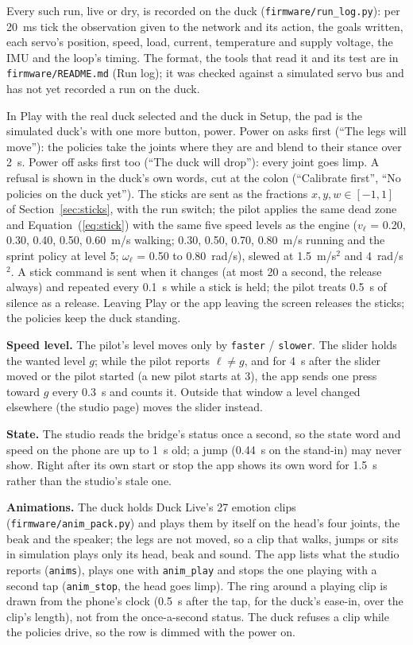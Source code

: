 \documentclass[11pt]{article}
\begin{document}
Every such run, live or dry, is recorded on the duck (\texttt{firmware/run\_log.py}): per 20~ms tick the
observation given to the network and its action, the goals written, each servo's position, speed, load, current,
temperature and supply voltage, the IMU and the loop's timing. The format, the tools that read it and its test are
in \texttt{firmware/README.md} (Run log); it was checked against a simulated servo bus and has not yet recorded a
run on the duck.

In Play with the real duck selected and the duck in Setup, the pad is the simulated duck's with one more button,
power. Power on asks first (``The legs will move''): the policies take the joints where they are and blend to
their stance over 2~s. Power off asks first too (``The duck will drop''): every joint goes limp. A refusal is
shown in the duck's own words, cut at the colon (``Calibrate first'', ``No policies on the duck yet'').
The sticks are sent as the fractions $x, y, w \in [-1, 1]$ of Section~\ref{sec:sticks}, with the run switch; the
pilot applies the same dead zone and Equation~(\ref{eq:stick}) with the same five speed levels as the engine
($v_\ell$ = 0.20, 0.30, 0.40, 0.50, 0.60~m/s walking; 0.30, 0.50, 0.70, 0.80~m/s running and the sprint policy at
level 5; $\omega_\ell$ = 0.50 to 0.80~rad/s), slewed at 1.5~m/s$^2$ and 4~rad/s$^2$. A stick command is sent when
it changes (at most 20 a second, the release always) and repeated every 0.1~s while a stick is held; the pilot
treats 0.5~s of silence as a release. Leaving Play or the app leaving the screen releases the sticks; the policies
keep the duck standing.

\textbf{Speed level.} The pilot's level moves only by \texttt{faster} / \texttt{slower}. The slider holds the
wanted level $g$; while the pilot reports $\ell \ne g$, and for 4~s after the slider moved or the pilot started
(a new pilot starts at 3), the app sends one press toward $g$ every 0.3~s and counts it. Outside that window a
level changed elsewhere (the studio page) moves the slider instead.

\textbf{State.} The studio reads the bridge's status once a second, so the state word and speed on the phone are
up to 1~s old; a jump (0.44~s on the stand-in) may never show. Right after its own start or stop the app shows its
own word for 1.5~s rather than the studio's stale one.

\textbf{Animations.} The duck holds Duck Live's 27 emotion clips (\texttt{firmware/anim\_pack.py}) and plays them
by itself on the head's four joints, the beak and the speaker; the legs are not moved, so a clip that walks, jumps
or sits in simulation plays only its head, beak and sound. The app lists what the studio reports
(\texttt{anims}), plays one with \texttt{anim\_play} and stops the one playing with a second tap
(\texttt{anim\_stop}, the head goes limp). The ring around a playing clip is drawn from the phone's clock (0.5~s
after the tap, for the duck's ease-in, over the clip's length), not from the once-a-second status. The duck refuses
a clip while the policies drive, so the row is dimmed with the power on.
\end{document}

